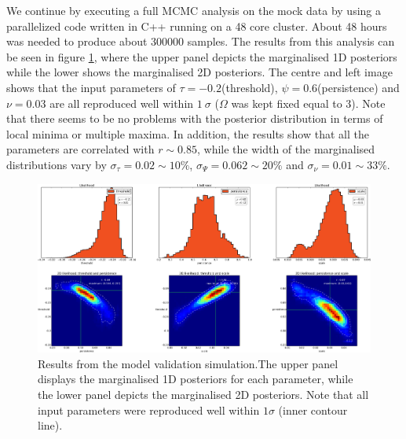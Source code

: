 \documentclass[aps,pre,twocolumn,letterpaper,floatfix,showpacs]{revtex4}
\begin{document}
We continue by executing a full MCMC analysis on the mock data by using a
parallelized code written in C++ running on a 48 core cluster. About 48 hours
was needed to produce about 300000 samples. The results from this analysis
can be seen in figure \ref{fig:mockdataresults_pts}, where the upper panel
depicts the marginalised 1D posteriors while the lower shows the marginalised
2D posteriors. The centre and left image shows that the input parameters of
$\tau=-0.2$(threshold), $\psi=0.6$(persistence) and $\nu=0.03$ are all reproduced
well within $1 \ \sigma$ ($\Omega$ was kept fixed equal to 3). Note that there seems to be no problems with the posterior
distribution in terms of local minima or multiple maxima. In addition, the results
show that all the parameters are correlated with $r \sim 0.85$, while the width of
the marginalised distributions vary by $\sigma_\tau = 0.02 \sim 10\%$, $\sigma_\Psi = 0.062 \sim 20\%$ and $\sigma_\nu = 0.01 \sim 33\%$. 

\begin{figure}
\includegraphics[width=.99\textwidth]{mock_data_results_pts.png}
\caption{Results from the model validation simulation.The upper panel displays the marginalised 1D posteriors for each parameter, while the lower panel depicts the marginalised 2D posteriors. Note that all input parameters were reproduced well within $1 \sigma$ (inner contour line).}
\label{fig:mockdataresults_pts}
\end{figure}
\end{document}
